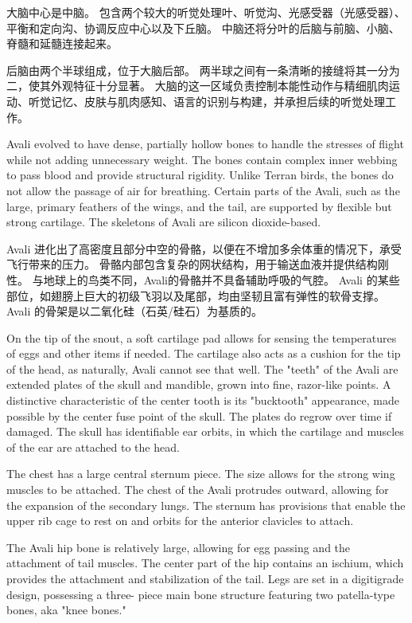 大脑中心是中脑。
包含两个较大的听觉处理叶、听觉沟、光感受器（光感受器）、平衡和定向沟、协调反应中心以及下丘脑。
中脑还将分叶的后脑与前脑、小脑、脊髓和延髓连接起来。

后脑由两个半球组成，位于大脑后部。
两半球之间有一条清晰的接缝将其一分为二，使其外观特征十分显著。
大脑的这一区域负责控制本能性动作与精细肌肉运动、听觉记忆、皮肤与肌肉感知、语言的识别与构建，并承担后续的听觉处理工作。


Avali evolved to have dense, partially hollow bones to handle the stresses of flight while not adding unnecessary weight.
The bones contain complex inner webbing to pass blood and provide structural rigidity.
Unlike Terran birds, the bones do not allow the passage of air for breathing.
Certain parts of the Avali, such as the large, primary feathers of the wings, and the tail, are supported by flexible but strong cartilage.
The skeletons of Avali are silicon dioxide-based.

Avali 进化出了高密度且部分中空的骨骼，以便在不增加多余体重的情况下，承受飞行带来的压力。
骨骼内部包含复杂的网状结构，用于输送血液并提供结构刚性。
与地球上的鸟类不同，Avali的骨骼并不具备辅助呼吸的气腔。
Avali 的某些部位，如翅膀上巨大的初级飞羽以及尾部，均由坚韧且富有弹性的软骨支撑。
Avali 的骨架是以二氧化硅（石英/硅石）为基质的。

On the tip of the snout, a soft cartilage
pad allows for sensing the temperatures of eggs
and other items if needed. The cartilage also
acts as a cushion for the tip of the head, as
naturally, Avali cannot see that well. The
"teeth" of the Avali are extended plates of the
skull and mandible, grown into fine, razor-like
points. A distinctive
characteristic of the
center tooth is its
"bucktooth" appearance,
made possible by the
center fuse point of the
skull. The plates do
regrow over time if
damaged. The skull has
identifiable ear orbits, in
which the cartilage and
muscles of the ear are
attached to the head.

The chest has a
large central sternum
piece. The size allows for
the strong wing muscles to
be attached. The chest of
the Avali protrudes
outward, allowing for the
expansion of the secondary
lungs. The sternum has
provisions that enable the
upper rib cage to rest on
and orbits for the anterior
clavicles to attach.

The Avali hip
bone is relatively large,
allowing for egg passing
and the attachment of tail
muscles. The center part
of the hip contains an
ischium, which provides
the attachment and
stabilization of the tail.
Legs are set in a
digitigrade design,
possessing a three-
piece main bone
structure featuring two patella-type bones,
aka "knee bones."

